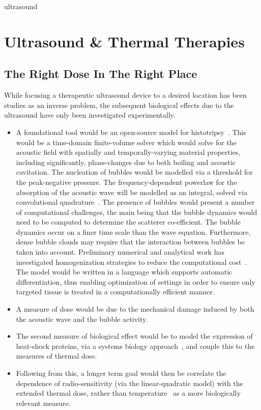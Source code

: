 \documentclass[11pt, a4paper, sans]{moderncv}
\begin{document}


\begin{btUnit} 

\begin{btSect}{ultrasound} 
%
\section*{Ultrasound \& Thermal Therapies}

\subsection*{The Right Dose In The Right Place}
While focusing a therapeutic ultrasound device to a desired location has been studies as an inverse problem, the subsequent biological effects due to the ultrasound have only been investigated experimentally. 
%
\begin{itemize}
\item A foundational tool would be an open-source model for histotripsy~\cite{pahk2017numerical}. This would be a time-domain finite-volume solver which would solve for the acoustic field with spatially and temporally-varying material properties, including significantly, \textcolor{custom}{phase-changes due to both boiling and acoustic cavitation}. The nucleation of bubbles would be modelled via a threshold for the peak-negative pressure. The frequency-dependent powerlaw for the absorption of the acoustic wave will be modelled as an integral, solved via convolutional quadrature~\cite{banjai2014fast}. The presence of bubbles would present a number of computational challenges, the main being that the bubble dynamics would need to be computed to determine the scatterer co-efficient. The bubble dynamics occur on a finer time scale than the wave equation. Furthermore, dense bubble clouds may require that the interaction between bubbles be taken into account. Preliminary numerical and analytical work has investigated homogenization strategies to reduce the computational cost~\cite{sinden2012approximations}. The model would be written in a language which supports automatic differentiation, thus enabling optimization of settings in order to ensure only targeted tissue is treated in a computationally efficient manner.
\item A measure of dose would be due to the \textcolor{custom}{mechanical damage} induced by both the acoustic wave and the bubble activity.
\item The second measure of biological effect would be to model the expression of \textcolor{custom}{heat-shock proteins}, via a systems biology approach~\cite{dudziuk2019biologically}, and couple this to the measures of thermal dose.
\item Following from this, a longer term goal would then be \textcolor{custom}{correlate the dependence of radio-sensitivity} (via the linear-quadratic model) with the extended \textcolor{custom}{thermal dose}, rather than temperature~\cite{kok2014quantifying} as a more biologically relevant measure.
\end{itemize}


\end{btSect}
\end{btUnit}
\end{document}
